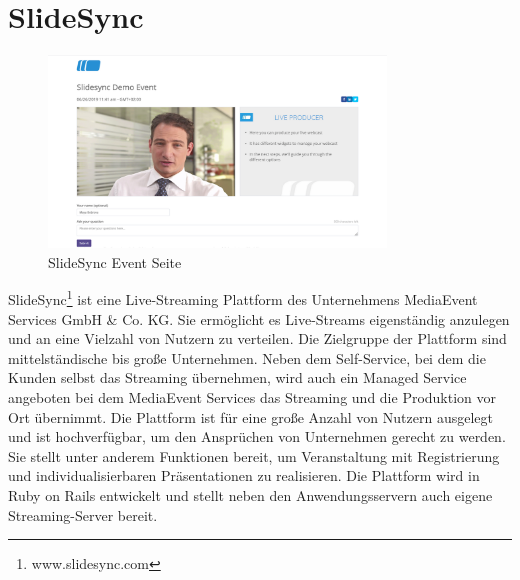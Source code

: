 
%
%
%
%
%




\section{SlideSync}
\begin{figure}[!h]
	\centering
	\includegraphics[width=0.8\textwidth]{figures/Slidesync_screenshot}
	\caption[SlideSync Event Seite]{SlideSync Event Seite}
	\label{fig:slidesync_screenshot}
\end{figure}
SlideSync\footnote{www.slidesync.com} ist eine Live-Streaming Plattform des Unternehmens MediaEvent Services GmbH \& Co. KG. Sie ermöglicht es Live-Streams eigenständig anzulegen und an eine Vielzahl von Nutzern zu verteilen. Die Zielgruppe der Plattform sind mittelständische bis große Unternehmen. Neben dem Self-Service, bei dem die Kunden selbst das Streaming übernehmen, wird auch ein Managed Service angeboten bei dem MediaEvent Services das Streaming und die Produktion vor Ort übernimmt. Die Plattform ist für eine große Anzahl von Nutzern ausgelegt und ist hochverfügbar, um den Ansprüchen von Unternehmen gerecht zu werden. Sie stellt unter anderem Funktionen bereit, um Veranstaltung mit Registrierung und individualisierbaren Präsentationen zu realisieren. Die Plattform wird in Ruby on Rails entwickelt und stellt neben den Anwendungsservern auch eigene Streaming-Server bereit.
